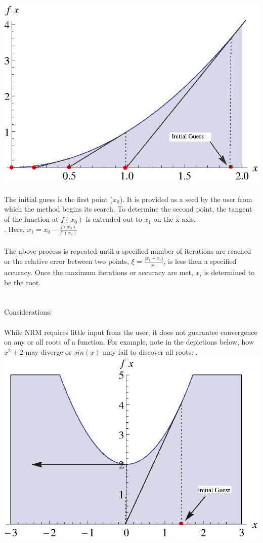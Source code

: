 \documentclass{report}
\begin{document}
\begin{enumerate}
\\\includegraphics[scale=1.2]{newtonraphson.eps}
\\
\\The initial guess is the first point ($x_0$). It is provided as a seed by the user from which the method begins its search. To determine the second point, the tangent of the function at $f(x_0)$ is extended out to $x_1$ on the x-axis. 
\\.\hspace{30 mm} Here, $\displaystyle x_1 = x_0 - \frac{f(x_0)}{f'(x_0)}$  
\\
\\ The above process is repeated until a specified number of iterations are reached or the relative error between two points, $\displaystyle \xi = \frac{\left|x_1-x_0\right|}{x_1}$, is less then a specified accuracy. Once the maximum iterations or accuracy are met, $x_i$ is determined to be the root.
\\
\\
\\Considerations: 
\\
\\While NRM requires little input from the user, it does not guarantee convergence on any or all roots of a function. For example, note in the depictions below, how $x^2+2$ may diverge or $sin(x)$ may fail to discover all roots:
. \hspace{4 mm} \includegraphics[scale=.5]{divergence.eps} 

\end{enumerate}
\end{document}
